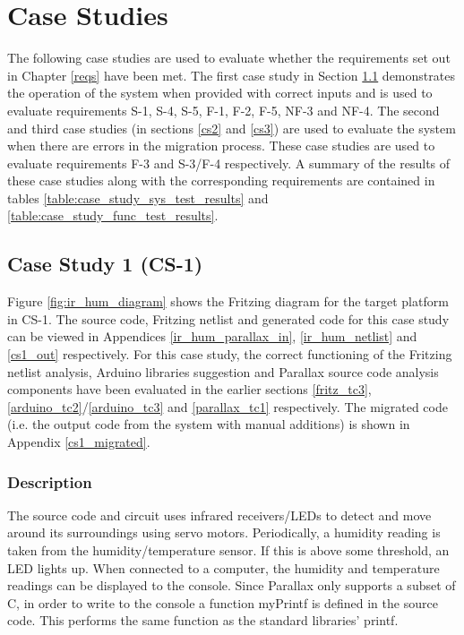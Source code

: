 \documentclass{UoYCSproject}
\begin{document}
\section{Case Studies} \label{eval_case_studies}
The following case studies are used to evaluate whether the requirements set out in Chapter \ref{reqs} have been met. The first case study in Section \ref{cs1} demonstrates the operation of the system when provided with correct inputs and is used to evaluate requirements S-1, S-4, S-5, F-1, F-2, F-5, NF-3 and NF-4. The second and third case studies (in sections \ref{cs2} and \ref{cs3}) are used to evaluate the system when there are errors in the migration process. These case studies are used to evaluate requirements F-3 and S-3/F-4 respectively. A summary of the results of these case studies along with the corresponding requirements are contained in tables \ref{table:case_study_sys_test_results} and \ref{table:case_study_func_test_results}.

\subsection{Case Study 1 (CS-1)} \label{cs1}
Figure \ref{fig:ir_hum_diagram} shows the Fritzing diagram for the target platform in CS-1. The source code, Fritzing netlist and generated code for this case study can be viewed in Appendices \ref{ir_hum_parallax_in}, \ref{ir_hum_netlist} and \ref{cs1_out} respectively. For this case study, the correct functioning of the Fritzing netlist analysis, Arduino libraries suggestion and Parallax source code analysis components have been evaluated in the earlier sections \ref{fritz_tc3}, \ref{arduino_tc2}/\ref{arduino_tc3} and \ref{parallax_tc1} respectively. The migrated code (i.e. the output code from the system with manual additions) is shown in Appendix \ref{cs1_migrated}.

\subsubsection{Description} \label{cs1_description}
The source code and circuit uses infrared receivers/LEDs to detect and move around its surroundings using servo motors. Periodically, a humidity reading is taken from the humidity/temperature sensor. If this is above some threshold, an LED lights up. When connected to a computer, the humidity and temperature readings can be displayed to the console. Since Parallax only supports a subset of C, in order to write to the console a function myPrintf is defined in the source code. This performs the same function as the standard libraries' printf.
\end{document}

